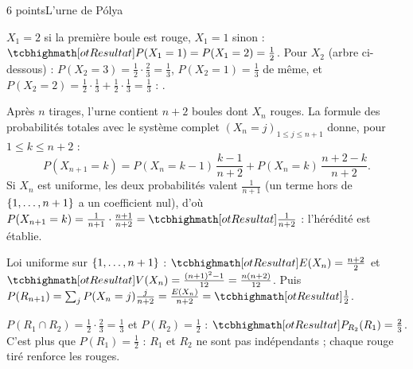 

\begin{corrigeEval}{6 points}{L'urne de Pólya}
\begin{questions}
  \item $X_1=2$ si la première boule est rouge, $X_1=1$ sinon :
    $\res{P(X_1=1)=P(X_1=2)=\frac12}$. Pour $X_2$ (arbre ci-dessous) :
    $P(X_2=3)=\frac12\cdot\frac23=\frac13$, $P(X_2=1)=\frac13$ de même, et
    $P(X_2=2)=\frac12\cdot\frac13+\frac12\cdot\frac13=\frac13$ :
    . 
  \item Après $n$ tirages, l'urne contient $n+2$ boules dont $X_n$ rouges.
    La formule des probabilités totales avec le système complet
    $(X_n=j)_{1\leqslant j\leqslant n+1}$ donne, pour
    $1\leqslant k\leqslant n+2$ :
    \[P(X_{n+1}=k)=P(X_n=k-1)\,\frac{k-1}{n+2}+P(X_n=k)\,\frac{n+2-k}{n+2}.\]
    Si $X_n$ est uniforme, les deux probabilités valent $\frac{1}{n+1}$ (un
    terme hors de $\left\{1,\dots,n+1\right\}$ a un coefficient nul), d'où
    $P(X_{n+1}=k)=\frac{1}{n+1}\cdot\frac{n+1}{n+2}=\res{\frac{1}{n+2}}$ :
    l'hérédité est établie. 
  \item Loi uniforme sur $\left\{1,\dots,n+1\right\}$ :
    $\res{E(X_n)=\frac{n+2}{2}}$ et
    $\res{V(X_n)=\frac{(n+1)^{2}-1}{12}=\frac{n(n+2)}{12}}$. Puis
    $P(R_{n+1})=\sum_{j}P(X_n=j)\frac{j}{n+2}=\frac{E(X_n)}{n+2}=\res{\frac12}$.
  \item $P(R_1\cap R_2)=\frac12\cdot\frac23=\frac13$ et $P(R_2)=\frac12$ :
    $\res{P_{R_2}(R_1)=\frac23}$. C'est plus que $P(R_1)=\frac12$ : $R_1$ et
    $R_2$ ne sont pas indépendants ; chaque rouge tiré renforce les
    rouges. \pts{1 pt}
\end{questions}
\begin{center}\begin{minipage}{\linewidth}\centering
{}
\end{minipage}
\end{center}
\end{corrigeEval}
